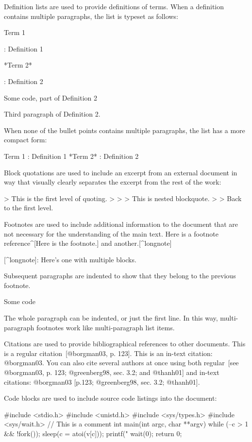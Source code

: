 \documentclass[
  digital,     %
  twoside,     %
  lof,         %
  lot,         %
]{fithesis4}
\begin{document}
\begin{markdown}
Definition lists are used to provide definitions of terms. When
a definition contains multiple paragraphs, the list is typeset
as follows:

Term 1

:   Definition 1

*Term 2*

:   Definition 2

        Some code, part of Definition 2

    Third paragraph of Definition 2.

When none of the bullet points contains multiple paragraphs, the
list has a more compact form:

Term 1
:   Definition 1
*Term 2*
:   Definition 2

Block quotations are used to include an excerpt from an external
document in way that visually clearly separates the excerpt from
the rest of the work:

> This is the first level of quoting.
>
> > This is nested blockquote.
>
> Back to the first level.

Footnotes are used to include additional information to the
document that are not necessary for the understanding of the main
text. Here is a footnote reference^[Here is the footnote.] and
another.[^longnote]

[^longnote]: Here's one with multiple blocks.

    Subsequent paragraphs are indented to show that they
belong to the previous footnote.

        Some code

    The whole paragraph can be indented, or just the first
    line.  In this way, multi-paragraph footnotes work like
    multi-paragraph list items.

Citations are used to provide bibliographical references to other
documents. This is a regular citation~[@borgman03, p. 123]. This is
an in-text citation: @borgman03. You can also cite several authors
at once using both regular~[see @borgman03, p. 123; @greenberg98,
sec.  3.2; and @thanh01] and in-text citations: @borgman03 [p.123;
@greenberg98, sec. 3.2; @thanh01].

Code blocks are used to include source code listings into the
document:

    #include <stdio.h>
    #include <unistd.h>
    #include <sys/types.h>
    #include <sys/wait.h>
    // This is a comment
    int main(int argc, char **argv)
    {
        while (--c > 1 && !fork());
        sleep(c = atoi(v[c]));
        printf("%
        wait(0);
        return 0;
    }


\end{markdown}
\end{document}
